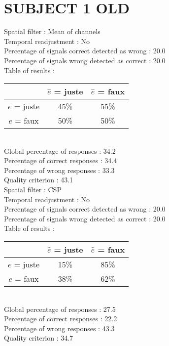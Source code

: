 \newpage
\section*{SUBJECT 1 OLD}
Spatial filter : Mean of channels \\
Temporal readjustment : No \\
Percentage of signals correct detected as wrong :   20.0 \\
Percentage of signals wrong detected as correct :   20.0 \\
Table of results : \\
\begin{tabular}{|c|c|c|}
\hline				& $\hat{e}$ = juste & $\hat{e}$ = faux \\
\hline  $e$ = juste	&     45\%			&     55\%		\\
\hline  $e$ = faux	&     50\%			&     50\%		\\
\hline
\end{tabular}\\
Global percentage of responses :   34.2 \\
Percentage of correct responses :   34.4 \\
Percentage of wrong responses :   33.3 \\
Quality criterion :   43.1 \\

Spatial filter : CSP \\
Temporal readjustment : No \\
Percentage of signals correct detected as wrong :   20.0 \\
Percentage of signals wrong detected as correct :   20.0 \\
Table of results : \\
\begin{tabular}{|c|c|c|}
\hline				& $\hat{e}$ = juste & $\hat{e}$ = faux \\
\hline  $e$ = juste	&     15\%			&     85\%		\\
\hline  $e$ = faux	&     38\%			&     62\%		\\
\hline
\end{tabular}\\
Global percentage of responses :   27.5 \\
Percentage of correct responses :   22.2 \\
Percentage of wrong responses :   43.3 \\
Quality criterion :   34.7 \\

